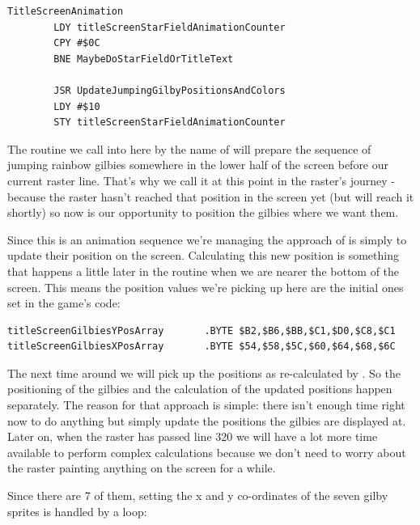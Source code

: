 \begin{lstlisting}
TitleScreenAnimation
        LDY titleScreenStarFieldAnimationCounter
        CPY #$0C
        BNE MaybeDoStarFieldOrTitleText

        JSR UpdateJumpingGilbyPositionsAndColors
        LDY #$10
        STY titleScreenStarFieldAnimationCounter
\end{lstlisting}

The routine we call into here by the name of  will prepare the sequence
of jumping rainbow gilbies somewhere in the lower half of the screen before our current raster line. That's why we
call it at this point in the raster's journey - because the raster hasn't reached that position in the screen yet
(but will reach it shortly) so now is our opportunity to position the gilbies where we want them. 

Since this is an animation sequence we're managing the approach of  is
simply to update their position on the screen. Calculating this new position is something that happens a little later
in the routine  when we are nearer the bottom of the screen. This means the
position values we're picking up here are the initial ones set in the game's code:

\begin{lstlisting}
titleScreenGilbiesYPosArray       .BYTE $B2,$B6,$BB,$C1,$D0,$C8,$C1
titleScreenGilbiesXPosArray       .BYTE $54,$58,$5C,$60,$64,$68,$6C
\end{lstlisting}

The next time around we will pick up the positions as re-calculated by .
So the positioning of the gilbies and the calculation of the updated positions happen separately. The reason
for that approach is simple: there isn't enough time right now to do anything but simply update the positions the gilbies
are displayed at.
Later on, when the raster has passed line 320 we will have a lot more time available to perform complex calculations
because we don't need to worry about the raster painting anything on the screen for a while.

Since there are 7 of them, setting the x and y co-ordinates of the seven gilby sprites is handled by a loop:

